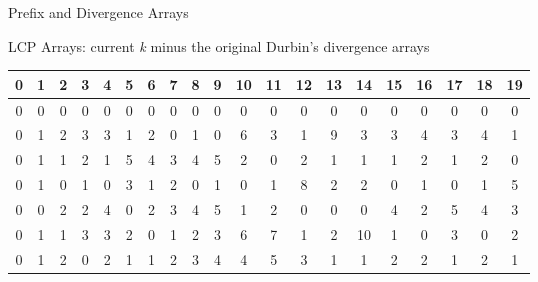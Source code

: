 \documentclass{beamer}
\begin{document}
\begin{frame}{Prefix and Divergence Arrays}
\begin{block}{LCP Arrays: current \textit{k} minus the original Durbin's
      divergence arrays}
    \begin{table}[H]
      \tiny
      \begin{tabular}{c|c|c|c|c|c|c|c|c|c|c|c|c|c|c|c|c|c|c|c}
        \hline
        0 & 1 & 2 & 3 & 4 & 5 & 6 & 7 & 8 & 9 & 10 & 11 & 12 & 13 & 14 & 15 & 16
        & 17 & 18 & 19\\
        \hline
        \hline
        0 & 0 & 0 & 0 & 0 & 0 & 0 & 0 & 0 & 0 & 0 & 0 & 0 & 0 & 0 & 0 & 0 & 0
             & 0 & 0 \\
        0 & 1 & 2 & 3 & 3 & 1 & 2 & 0 & 1 & 0 & 6 & 3 & 1 & 9 & 3 & 3 & 4 & 3
             & 4 & 1 \\
        0 & 1 & 1 & 2 & 1 & 5 & 4 & 3 & 4 & 5 & 2 & 0 & 2 & 1 & 1 & 1 & 2 & 1
             & 2 & 0 \\
        0 & 1 & 0 & 1 & 0 & 3 & 1 & 2 & 0 & 1 & 0 & 1 & 8 & 2 & 2 & 0 & 1 & 0
             & 1 & 5 \\
        0 & 0 & 2 & 2 & 4 & 0 & 2 & 3 & 4 & 5 & 1 & 2 & 0 & 0 & 0 & 4 & 2 & 5
             & 4 & 3 \\
        0 & 1 & 1 & 3 & 3 & 2 & 0 & 1 & 2 & 3 & 6 & 7 & 1 & 2 & 10 & 1 & 0 & 3
             & 0 & 2 \\
        0 & 1 & 2 & 0 & 2 & 1 & 1 & 2 & 3 & 4 & 4 & 5 & 3 & 1 & 1 & 2 & 2 & 1
             & 2 & 1\\
      \end{tabular}
    \end{table}
  \end{block}
\end{frame}
\end{document}

